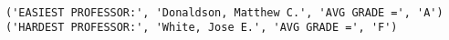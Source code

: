
\begin{verbatim}
    
('EASIEST PROFESSOR:', 'Donaldson, Matthew C.', 'AVG GRADE =', 'A')
('HARDEST PROFESSOR:', 'White, Jose E.', 'AVG GRADE =', 'F')
\end{verbatim}